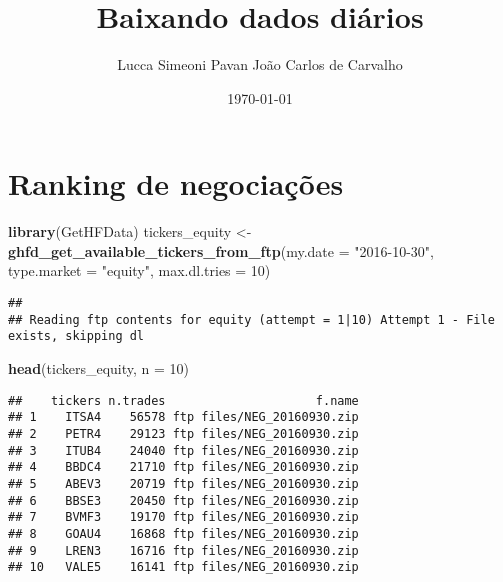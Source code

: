 \documentclass[]{article}
\title{Baixando dados diários}
\author{Lucca Simeoni Pavan \hspace{1cm} João Carlos de Carvalho}
\date{\today}
\newenvironment{Shaded}{\begin{snugshade}}{\end{snugshade}}
\newcommand{\KeywordTok}[1]{\textcolor[rgb]{0.13,0.29,0.53}{\textbf{{#1}}}}
\newcommand{\DataTypeTok}[1]{\textcolor[rgb]{0.13,0.29,0.53}{{#1}}}
\newcommand{\DecValTok}[1]{\textcolor[rgb]{0.00,0.00,0.81}{{#1}}}
\newcommand{\StringTok}[1]{\textcolor[rgb]{0.31,0.60,0.02}{{#1}}}
\newcommand{\OtherTok}[1]{\textcolor[rgb]{0.56,0.35,0.01}{{#1}}}
\newcommand{\NormalTok}[1]{{#1}}
\begin{document}
\maketitle

{
\setcounter{tocdepth}{2}
\tableofcontents
}
\begin{Shaded}
\end{Shaded}

\section{Ranking de negociações}\label{ranking-de-negociacoes}

\begin{Shaded}
\begin{Highlighting}[]
\KeywordTok{library}\NormalTok{(GetHFData)}
\NormalTok{tickers_equity <-}\StringTok{ }\KeywordTok{ghfd_get_available_tickers_from_ftp}\NormalTok{(}\DataTypeTok{my.date =} \StringTok{"2016-10-30"}\NormalTok{, }
    \DataTypeTok{type.market =} \StringTok{"equity"}\NormalTok{, }\DataTypeTok{max.dl.tries =} \DecValTok{10}\NormalTok{)}
\end{Highlighting}
\end{Shaded}

\begin{verbatim}
## 
## Reading ftp contents for equity (attempt = 1|10) Attempt 1 - File exists, skipping dl
\end{verbatim}

\begin{Shaded}
\begin{Highlighting}[]
\KeywordTok{head}\NormalTok{(tickers_equity, }\DataTypeTok{n =} \DecValTok{10}\NormalTok{)}
\end{Highlighting}
\end{Shaded}

\begin{verbatim}
##    tickers n.trades                     f.name
## 1    ITSA4    56578 ftp files/NEG_20160930.zip
## 2    PETR4    29123 ftp files/NEG_20160930.zip
## 3    ITUB4    24040 ftp files/NEG_20160930.zip
## 4    BBDC4    21710 ftp files/NEG_20160930.zip
## 5    ABEV3    20719 ftp files/NEG_20160930.zip
## 6    BBSE3    20450 ftp files/NEG_20160930.zip
## 7    BVMF3    19170 ftp files/NEG_20160930.zip
## 8    GOAU4    16868 ftp files/NEG_20160930.zip
## 9    LREN3    16716 ftp files/NEG_20160930.zip
## 10   VALE5    16141 ftp files/NEG_20160930.zip
\end{verbatim}
\end{document}

